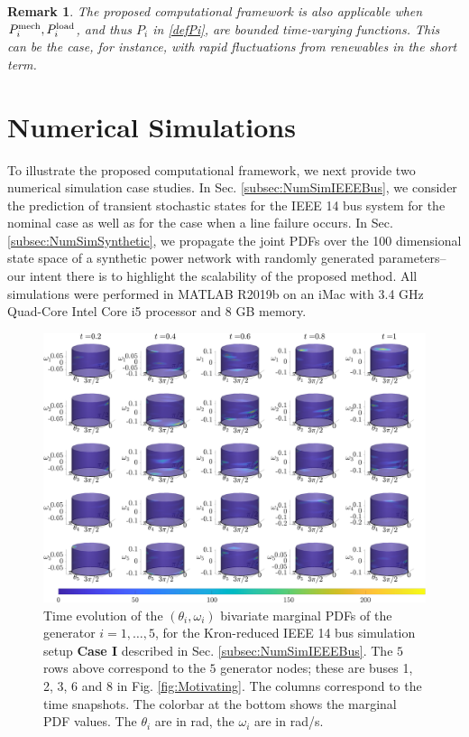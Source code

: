 \documentclass[10pt,twocolumn]{IEEEtran}
\newtheorem{remark}{Remark}
\begin{document}
\begin{remark}\label{remark:timevaryingEffectivePowerInput}
The proposed computational framework is also applicable when $P_{i}^{\rm{mech}}, P_{i}^{\rm{load}}$, and thus $P_{i}$ in \eqref{defPi}, are bounded time-varying functions. This can be the case, for instance, with rapid fluctuations from renewables in the short term.
\end{remark}




\section{Numerical Simulations}\label{sec:NumericalSimulations}
To illustrate the proposed computational framework, we next provide two numerical simulation case studies. In Sec. \ref{subsec:NumSimIEEEBus}, we consider the prediction of transient stochastic states for the IEEE 14 bus system for the nominal case as well as for the case when a line failure occurs. In Sec. \ref{subsec:NumSimSynthetic}, we propagate the joint PDFs over the 100 dimensional state space of a synthetic power network with randomly generated parameters--our intent there is to highlight the scalability of the proposed method. All simulations were performed in MATLAB R2019b on an iMac with 3.4 GHz Quad-Core Intel Core i5 processor and 8 GB memory. 



\begin{figure}[t]
\centering
\includegraphics[width=0.9\linewidth]{IEEE14marginalsCase0.png}
\caption{\small{Time evolution of the $(\theta_{i},\omega_{i})$ bivariate marginal PDFs of the generator $i=1,\hdots,5$, for the Kron-reduced IEEE 14 bus simulation setup \textbf{Case I} described in Sec. \ref{subsec:NumSimIEEEBus}. The $5$ rows above correspond to the $5$ generator nodes; these are buses 1, 2, 3, 6 and 8 in Fig. \ref{fig:Motivating}. The columns correspond to the time snapshots. The colorbar at the bottom shows the marginal PDF values. The $\theta_i$ are in rad, the $\omega_i$ are in rad/s.}}
\vspace*{-0.1in}
\label{fig:IEEE14marginalsCase0}
\end{figure}
\end{document}

